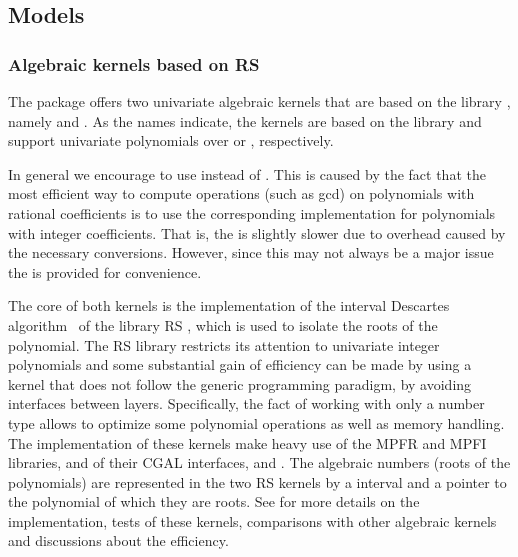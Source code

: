 
\subsection{Models}

\subsubsection{Algebraic kernels based on RS}

The package offers two univariate algebraic kernels that are based on 
the library \rs{} \cite{cgal:r-rs}, namely 
and . As the names indicate, 
the kernels are based on the library \rs{} \cite{cgal:r-rs} and support univariate 
polynomials over  or , respectively. 

In general we encourage to use 
instead of . This is caused by
the fact that the most efficient way to compute operations (such as gcd)
on polynomials with rational coefficients is to use the corresponding
implementation for polynomials with integer coefficients.  That is,
the  is slightly slower due to
overhead caused by the necessary conversions.  However, since this may
not always be a major issue the 
is provided for convenience.


The core of both kernels is the implementation of the interval Descartes 
algorithm~\cite{cgal:rz-jcam-04} of the library RS \cite{cgal:r-rs}, 
which is used to isolate the roots of the polynomial. 
The RS library restricts its attention to univariate integer
polynomials and some substantial gain of efficiency can be made by using a kernel
that does not follow the generic programming paradigm, by avoiding
interfaces between layers.  Specifically, the fact of working with
only a number type allows to optimize some polynomial operations
as well as memory handling.  The implementation of these kernels
make heavy use of the MPFR \cite{cgal:mt-mpfr} and MPFI \cite{cgal:r-mpfi}
libraries, and of their CGAL interfaces,  and .
The algebraic numbers (roots of the polynomials) are represented
in the two RS kernels by a  interval and a pointer to
the polynomial of which they are roots.  See \cite{cgal:lpt-wea-09} 
for more details on the implementation, tests of these kernels,
comparisons with other algebraic kernels and discussions about the
efficiency.  


